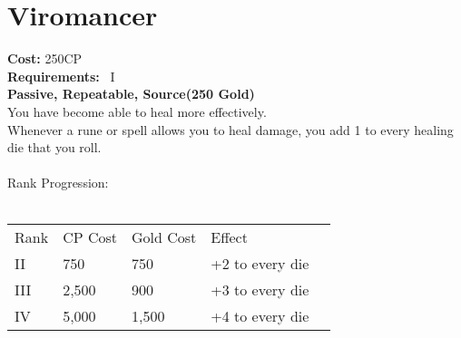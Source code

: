 \section{Viromancer}\label{perk:viromancer}
\textbf{Cost:} 250CP\\
\textbf{Requirements:}~ I\\
\textbf{Passive, Repeatable, Source(250 Gold)}\\
You have become able to heal more effectively.\\
Whenever a rune or spell allows you to heal damage, you add 1 to every healing die that you roll.\\
\\
Rank Progression:\\
\\
\begin{tabular}{l | l | l | l | l}
    Rank & CP Cost & Gold Cost &  Effect\\
    II & 750 & 750 & +2 to every die\\
    III & 2,500 & 900 & +3 to every die\\
    IV & 5,000 & 1,500 & +4 to every die\\
\end{tabular}